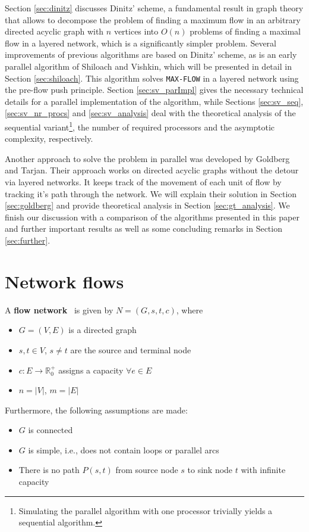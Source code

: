 \documentclass[a4paper,10pt, twocolumn]{article}
\begin{document}
Section \ref{sec:dinitz} discusses Dinitz' scheme, a fundamental result in graph theory that allows to  decompose the problem of finding a maximum flow in an arbitrary directed acyclic graph with $n$ vertices into $O(n)$ problems of finding a maximal flow in a layered network, which is a significantly simpler problem. Several improvements of previous algorithms are based on Dinitz' scheme, as is an early parallel algorithm of Shiloach and Vishkin, which will be presented in detail in  Section \ref{sec:shiloach}. This algorithm solves \lstinline|MAX-FLOW| in a layered network using the pre-flow push principle. Section \ref{sec:sv_parImpl} gives the necessary technical details for a parallel implementation of the algorithm, while Sections \ref{sec:sv_seq}, \ref{sec:sv_nr_procs} and \ref{sec:sv_analysis} deal with the theoretical analysis of the sequential variant\footnote{Simulating the parallel algorithm with one processor trivially yields a sequential algorithm.}, the number of required processors and the asymptotic complexity, respectively.

Another approach to solve the problem in parallel was developed by Goldberg and Tarjan. Their approach works on directed acyclic graphs without the detour via layered networks. It keeps track of the movement of each unit of flow by tracking it's path through the network. We will explain their solution in Section \ref{sec:goldberg} and provide theoretical analysis in Section \ref{sec:gt_analysis}. We finish our discussion with a comparison of the algorithms presented in this paper and further important results as well as some concluding remarks in Section \ref{sec:further}. 

\section{Network flows}
\label{sec:networkFlows}
A \textbf{flow network}~\cite{ahuja93} is given by $N = (G,s,t,c)$, where
\begin{itemize}
	\item $G =(V,E)$ is a directed graph
    \item $s, t \in V$, $s \neq t$ are the source and terminal node
   	\item $c:E\rightarrow \mathbb{R}_0^{+}$ assigns a capacity $\forall e \in E$
   	\item $n=\lvert V\rvert$, $m=\lvert E\rvert$
\end{itemize}

Furthermore, the following assumptions are made:
\begin{itemize}
	\item $G$ is connected
	\item $G$ is simple, i.e., does not contain loops or parallel arcs
	\item There is no path $P(s,t)$ from source node $s$ to sink node $t$ with infinite capacity
\end{itemize}
\end{document}
